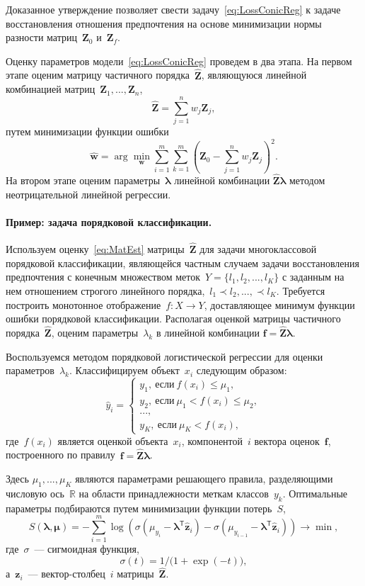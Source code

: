 \documentclass{elsarticle}
\newcommand{\bz}{\mathbf{z}}
\newcommand{\bw}{\mathbf{w}}
\newcommand{\bfx}{\mathbf{f}}
\newcommand{\bZ}{\mathbf{Z}}
\newcommand{\blambda}{\boldsymbol{\lambda}}
\newcommand{\T}{^{\mathsf{T}}}
\begin{document}
Доказанное утверждение позволяет свести задачу~\eqref{eq:LossConicReg} к задаче восстановления отношения предпочтения на основе минимизации нормы разности матриц~$\bZ_0$ и~$\bZ_f$.

Оценку параметров модели~\eqref{eq:LossConicReg} проведем в два этапа. На первом этапе оценим матрицу частичного порядка~$\hat{\bZ}$, являющуюся линейной комбинацией матриц~$\bZ_1,...,\bZ_n$,
\begin{equation}
\hat{\bZ}=\sum\limits_{j=1}^n w_j\bZ_j,
\label{eq:MatEst}
\end{equation}
путем минимизации функции ошибки
\begin{equation}
\hat{\bw} = \arg\min\limits_{\bw}\sum\limits_{i=1}^m\sum\limits_{k=1}^m\left(\bZ_0 - \sum\limits_{j=1}^n w_j\bZ_j\right)^2.
\label{eq:MatSol}
\end{equation}
На втором этапе оценим параметры~$\blambda$ линейной комбинации $\hat{\bZ}\blambda$ методом неотрицательной линейной регрессии.


\paragraph{Пример: задача порядковой классификации.} Используем оценку~\eqref{eq:MatEst} матрицы~$\hat{\bZ}$ для задачи многоклассовой порядковой классификации, являющейся частным случаем задачи восстановления предпочтения с конечным множеством меток~$Y=\{l_1,l_2,...,l_K\}$ с заданным на нем отношением строгого линейного порядка,~$l_1\prec l_2,...,\prec l_K$. Требуется построить монотонное отображение~$f:X\rightarrow Y$, доставляющее минимум функции ошибки порядковой классификации. Располагая оценкой матрицы частичного порядка~$\hat{\bZ}$, оценим параметры~$\lambda_k$ в линейной комбинации $\bfx = \hat{\bZ}\blambda$.

Воспользуемся методом порядковой логистической регрессии для оценки параметров~$\lambda_k$. Классифицируем объект~$x_i$ следующим образом:
\[
\hat{y}_i=
\begin{cases}
y_1,~\text{если}~f(x_i) \leq \mu_1, \\
y_2,~\text{если}~\mu_1 < f(x_i) \leq \mu_2, \\
..., \\
y_K,~\text{если}~\mu_K < f(x_i),
\end{cases}
\]
где~$f(x_i)$ является оценкой объекта~$x_i$, компонентой~$i$ вектора оценок~$\bfx$, построенного по правилу~$\bfx=\hat{\bZ}\blambda$.

Здесь $\mu_1,...,\mu_K$ являются параметрами решающего правила, разделяющими числовую ось~$\mathbb{R}$ на области принадлежности меткам классов~$y_k$. Оптимальные параметры подбираются путем минимизации функции потерь~$S$,
\[
S(\blambda, \boldsymbol{\mu})=-\sum\limits_{i=1}^m \log\left(\sigma(\mu_{y_i}-\blambda\T \hat{\bz}_i) - \sigma(\mu_{y_{i-1}} - \blambda\T \hat{\bz}_i)\right)\rightarrow \min,
\]
где~$\sigma$~--- сигмоидная функция,
\[
\sigma(t)=1/\bigl(1 + \exp{(-t)}\bigr),
\]
а~$\bz_i$~--- вектор-столбец~$i$ матрицы~$\hat{\bZ}$.
\end{document}

